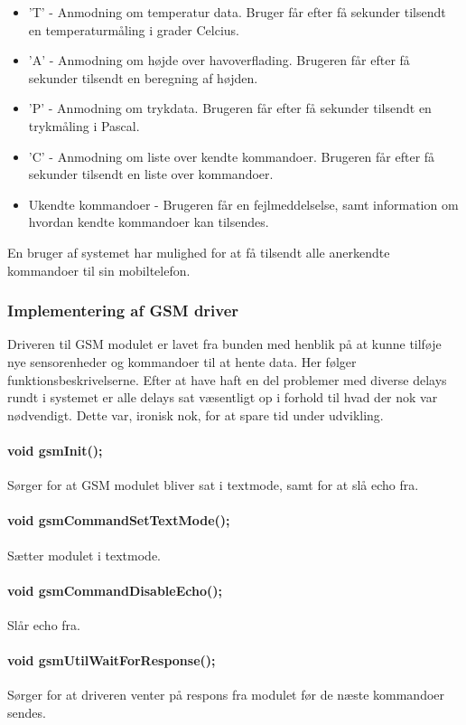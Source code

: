 \begin{itemize}
    \item 'T' - Anmodning om temperatur data. Bruger får efter få sekunder tilsendt en temperaturmåling i grader Celcius.
    \item 'A' - Anmodning om højde over havoverflading. Brugeren får efter få sekunder tilsendt en beregning af højden.
    \item 'P' - Anmodning om trykdata. Brugeren får efter få sekunder tilsendt en trykmåling i Pascal.
    \item 'C' - Anmodning om liste over kendte kommandoer. Brugeren får efter få sekunder tilsendt en liste over kommandoer.
    \item Ukendte kommandoer - Brugeren får en fejlmeddelselse, samt information om hvordan kendte kommandoer kan tilsendes.
\end{itemize}

En bruger af systemet har mulighed for at få tilsendt alle anerkendte kommandoer til sin mobiltelefon.

\subsubsection{Implementering af GSM driver}

Driveren til GSM modulet er lavet fra bunden med henblik på at kunne tilføje nye sensorenheder og kommandoer til at hente data. Her følger funktionsbeskrivelserne. Efter at have haft en del problemer med diverse delays rundt i systemet er alle delays sat væsentligt op i forhold til hvad der nok var nødvendigt. Dette var, ironisk nok, for at spare tid under udvikling.

\paragraph{void gsmInit();}
Sørger for at GSM modulet bliver sat i textmode, samt for at slå echo fra.

\paragraph{void gsmCommandSetTextMode();}
Sætter modulet i textmode.

\paragraph{void gsmCommandDisableEcho();}
Slår echo fra.

\paragraph{void gsmUtilWaitForResponse();}
Sørger for at driveren venter på respons fra modulet før de næste kommandoer sendes.

